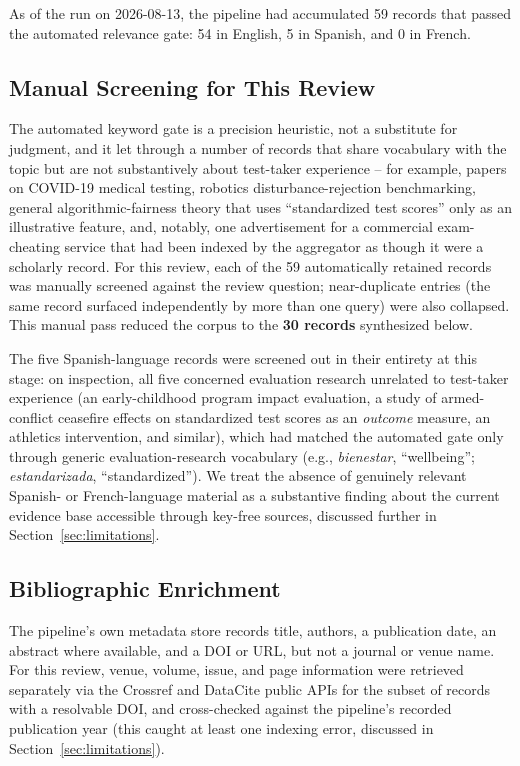\documentclass[11pt]{article}
\begin{document}
As of the run on 2026-08-13, the pipeline had accumulated 59 records that passed the automated relevance gate: 54 in English, 5 in Spanish, and 0 in French.

\subsection{Manual Screening for This Review}
\label{sec:screening}

The automated keyword gate is a precision heuristic, not a substitute for judgment, and it let through a number of records that share vocabulary with the topic but are not substantively about test-taker experience -- for example, papers on COVID-19 medical testing, robotics disturbance-rejection benchmarking, general algorithmic-fairness theory that uses ``standardized test scores'' only as an illustrative feature, and, notably, one advertisement for a commercial exam-cheating service that had been indexed by the aggregator as though it were a scholarly record. For this review, each of the 59 automatically retained records was manually screened against the review question; near-duplicate entries (the same record surfaced independently by more than one query) were also collapsed. This manual pass reduced the corpus to the \textbf{30 records} synthesized below.

The five Spanish-language records were screened out in their entirety at this stage: on inspection, all five concerned evaluation research unrelated to test-taker experience (an early-childhood program impact evaluation, a study of armed-conflict ceasefire effects on standardized test scores as an \emph{outcome} measure, an athletics intervention, and similar), which had matched the automated gate only through generic evaluation-research vocabulary (e.g., \textit{bienestar}, ``wellbeing''; \textit{estandarizada}, ``standardized''). We treat the absence of genuinely relevant Spanish- or French-language material as a substantive finding about the current evidence base accessible through key-free sources, discussed further in Section~\ref{sec:limitations}.

\subsection{Bibliographic Enrichment}

The pipeline's own metadata store records title, authors, a publication date, an abstract where available, and a DOI or URL, but not a journal or venue name. For this review, venue, volume, issue, and page information were retrieved separately via the Crossref and DataCite public APIs for the subset of records with a resolvable DOI, and cross-checked against the pipeline's recorded publication year (this caught at least one indexing error, discussed in Section~\ref{sec:limitations}).
\end{document}
